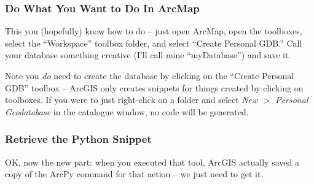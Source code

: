 \documentclass[12pt]{article}
\begin{document}
\subsubsection*{Do What You Want to Do In ArcMap}
This you (hopefully) know how to do -- just open ArcMap, open the toolboxes, select the ``Workspace'' toolbox folder, and select ``Create Personal GDB.'' Call your database something creative (I'll call mine ``myDatabase'') and save it. 

Note you \emph{do} need to create the database by clicking on the ``Create Personal GDB'' toolbox -- ArcGIS only creates snippets for things created by clicking on toolboxes. If you were to just right-click on a folder and select \emph{New $>$ Personal Geodatabase} in the catalogue window, no code will be generated. 

\subsubsection*{Retrieve the Python Snippet}
OK, now the new part: when you executed that tool, ArcGIS actually saved a copy of the ArcPy command for that action -- we just need to get it. 
\end{document}
